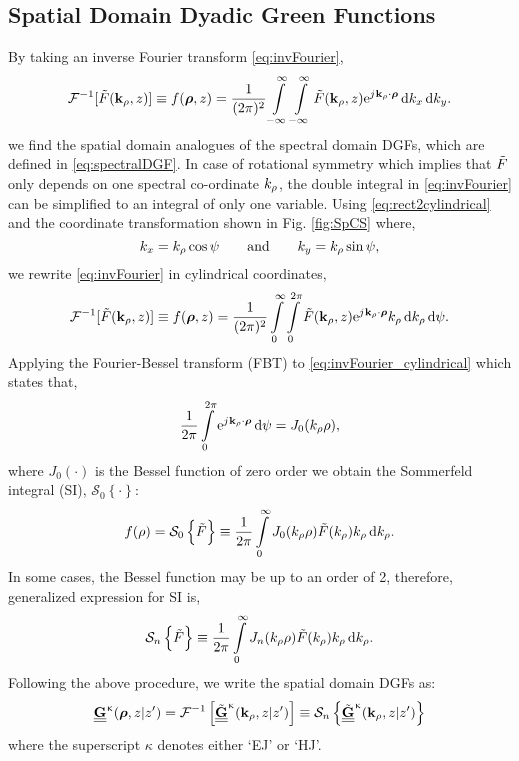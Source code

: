 \subsection{Spatial Domain Dyadic Green Functions}
%
By taking an inverse Fourier transform \eqref{eq:invFourier},
%
\begin{equation}
  \mathcal{F}^{-1}[\tilde{F}(\mathbf{k}_{\rho},z)] \equiv f({\boldsymbol {\rho}},z) = \frac{1}{(2 \pi )^2}\int\limits_{-\infty}^\infty \int\limits_{-\infty}^\infty
  \tilde{F}(\mathbf{k}_{\rho},z) \mathrm{e}^{{j}\mkern1mu \mathbf{k}_{\rho} \cdot {\boldsymbol {\rho}}} \mathop{}\!\mathrm{d}{k_x} \mathop{}\!\mathrm{d}{k_y}.
  \label{eq:invFourier}
\end{equation}
%
we find the spatial domain analogues of the spectral domain DGFs, which are  defined in \eqref{eq:spectralDGF}. In case of rotational symmetry which implies that $\tilde{F}$ only depends on one spectral co-ordinate $k_{\rho}$, the double integral in \eqref{eq:invFourier} can be simplified to an integral of only one variable. Using  \eqref{eq:rect2cylindrical} and the coordinate transformation shown in Fig. \ref{fig:SpCS} where,
%
\begin{equation}
    k_x = k_{\p} \cos \psi \qquad \text{and} \qquad
    k_y = k_{\p} \sin \psi,
  \label{eq:cylindricaltransformation}%
\end{equation}
we rewrite \eqref{eq:invFourier} in cylindrical coordinates,
%
\begin{equation}
  \mathcal{F}^{-1} [\tilde{F}(\mathbf{k}_{\rho},z)] \equiv f({\boldsymbol {\rho}},z) = \frac{1}{(2\pi)^2} \int\limits_0^{\infty} \int\limits_0^{2\pi}
  \tilde{F}(\mathbf{k}_{\rho},z) \mathrm{e}^{{j}\mkern1mu \mathbf{k}_{\rho} \cdot {\boldsymbol {\rho}}} k_{\rho} \mathop{}\!\mathrm{d}{k_{\rho}} \mathop{}\!\mathrm{d}{\psi}.
  \label{eq:invFourier_cylindrical}
\end{equation}
%
Applying the Fourier-Bessel transform (FBT) to \eqref{eq:invFourier_cylindrical} which states that,
\begin{equation}
  \frac{1}{2\pi}\int\limits_0^{2\pi}
  \mathrm{e}^{{j}\mkern1mu \mathbf{k}_{\rho} \cdot {\boldsymbol {\rho}}} \mathop{}\!\mathrm{d}{\psi} = J_0(k_{\rho}\rho),
  \label{eq:hankel_transofrm}
\end{equation}
%
where $J_0(\cdot)$ is the Bessel function of zero order
we obtain the Sommerfeld integral (SI), $\mathcal{S}_0\left \{\cdot\right \}$:
%
\begin{equation}
  f(\rho) = \mathcal{S}_0\left \{\tilde{F}\right \} \equiv \frac{1}{2\pi}\int\limits_0^{\infty} J_0(k_{\rho}\rho)  \tilde{F}(k_{\rho}) k_{\rho} \mathop{}\!\mathrm{d}{k_{\rho}}.
  \label{eq:sommerfeld_integral}
\end{equation}
%
In some cases, the Bessel function may be up to an order of 2, therefore, generalized expression for SI is,
%
\begin{equation}
    \mathcal{S}_n\left \{\ti{F}\right \} \equiv \frac{1}{2\pi}\int\limits_0^{\inf} J_n(k_{\p}\p)  \ti{F}(k_{\p}) k_{\p} \diff{k_{\p}}.
  \label{eq:generalized_SI}%
\end{equation}
%
Following the above procedure, we write the spatial domain DGFs as:
%
\begin{equation}
    {\tnsr{\v {G}}^\upkappa}({\vp}, z | z') = \mathcal{F}^{-1} \left[ \ti{\tnsr{\v {G}}}^\upkappa(\v k_{\p}, z | z') \right]
    \equiv \mathcal{S}_n\left \{\ti{\tnsr{\v {G}}}^\upkappa(\v k_{\p}, z | z')\right \}
  \label{eq:spatialDGF_generalized}%
\end{equation}
%
where the superscript $\kappa$ denotes either `EJ' or `HJ'.

